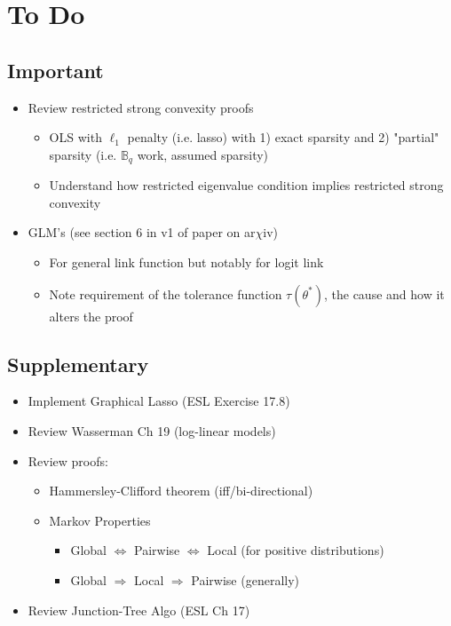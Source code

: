 \documentclass[11pt]{article}
\begin{document}
\newpage 

\section*{To Do}

\subsection*{Important}

\begin{itemize}
    \item Review restricted strong convexity proofs 
    \begin{itemize}
        \item OLS with $\ell_1$ penalty (i.e. lasso) with 1) exact sparsity and 2) "partial" sparsity (i.e. $\mathbb{B}_q$ work, assumed sparsity)
        \item Understand how restricted eigenvalue condition implies restricted strong convexity 
    \end{itemize}
    \item GLM's (see section 6 in v1 of paper on ar$\chi$iv)
    \begin{itemize}
        \item For general link function but notably for logit link
        \item Note requirement of the tolerance function $\tau(\theta^*)$, the cause and how it alters the proof 
    \end{itemize}
\end{itemize}


\subsection*{Supplementary}

\begin{itemize}
    \item Implement Graphical Lasso (ESL Exercise 17.8)
    \item Review Wasserman Ch 19 (log-linear models)
    \item Review proofs:
    \begin{itemize}
    	\item Hammersley-Clifford theorem (iff/bi-directional)
	    \item Markov Properties  
        \begin{itemize}
            \item Global $\Leftrightarrow$ Pairwise $\Leftrightarrow$ Local (for positive distributions)
            \item Global $\Rightarrow$ Local $\Rightarrow$ Pairwise (generally)
        \end{itemize}
    \end{itemize}
    \item Review Junction-Tree Algo (ESL Ch 17) 
\end{itemize}
\end{document}
